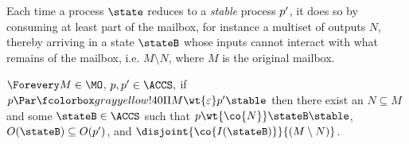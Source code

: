 Each time a process $\state$ reduces to a {\em stable} process
$p'$, it does so by consuming at least part of the mailbox, for
instance a multiset of outputs $N$, thereby arriving in a state
$\stateB$ whose inputs cannot interact with what remains of the
mailbox, i.e. $M \setminus N$, where $M$ is the original mailbox.

\begin{lemma}
  \label{lem:completeness-part-2.2-squigly-02}
  $\Forevery M \in \MO$, $p, \stateA \in \ACCS, $
  if $p \Par \mailbox{ \Pi M } \wt{\varepsilon} \stateA \stable$
  then there exist an $N \subseteq M$ and some $\stateB \in \ACCS$
  such that $p \wt{ \co{N} } \stateB  \stable$, $O(\stateB) \subseteq O( \stateA )$, and
  $\disjoint{\co{ I( \stateB ) }}{(M \setminus N)}$.
\end{lemma}
